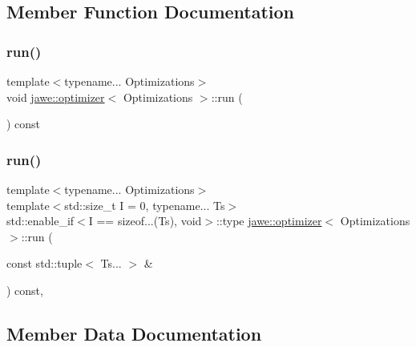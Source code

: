 \subsection{Member Function Documentation}
\mbox{\label{classjawe_1_1optimizer_a9f2cc9d996d8804137c40c5ac44899b4}} 
\subsubsection{\texorpdfstring{run()}{run()}\hspace{0.1cm}{\footnotesize\ttfamily [1/2]}}
{\footnotesize\ttfamily template$<$typename... Optimizations$>$ \\
void \hyperlink{classjawe_1_1optimizer}{jawe\+::optimizer}$<$ Optimizations $>$\+::run (\begin{DoxyParamCaption}{ }\end{DoxyParamCaption}) const\hspace{0.3cm}{\ttfamily [inline]}}

\mbox{\label{classjawe_1_1optimizer_a239dd9dd5b62d17dfe369146de836404}} 
\subsubsection{\texorpdfstring{run()}{run()}\hspace{0.1cm}{\footnotesize\ttfamily [2/2]}}
{\footnotesize\ttfamily template$<$typename... Optimizations$>$ \\
template$<$std\+::size\+\_\+t I = 0, typename... Ts$>$ \\
std\+::enable\+\_\+if$<$I == sizeof...(Ts), void$>$\+::type \hyperlink{classjawe_1_1optimizer}{jawe\+::optimizer}$<$ Optimizations $>$\+::run (\begin{DoxyParamCaption}\item[{const std\+::tuple$<$ Ts... $>$ \&}]{ }\end{DoxyParamCaption}) const\hspace{0.3cm}{\ttfamily [inline]}, {\ttfamily [private]}}



\subsection{Member Data Documentation}
\mbox{\label{classjawe_1_1optimizer_afc3e9e241057c762915ff5f3f1a62b00}} 
